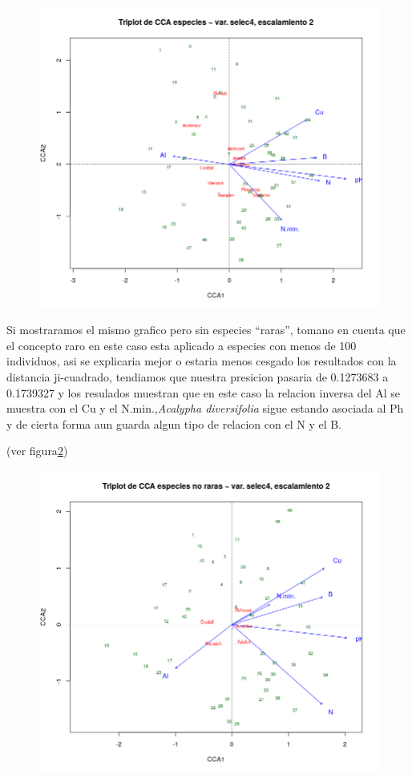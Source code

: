 \documentclass[11pt,]{article}
\begin{document}
\begin{figure}
\centering
\includegraphics{CCA.png}
\caption{\label{fig:CCA}}
\end{figure}

Si mostraramos el mismo grafico pero sin especies ``raras'', tomano en
cuenta que el concepto raro en este caso esta aplicado a especies con
menos de 100 individuos, asi se explicaria mejor o estaria menos cesgado
los resultados con la distancia ji-cuadrado, tendiamos que nuestra
presicion pasaria de 0.1273683 a 0.1739327 y los resulados muestran que
en este caso la relacion inversa del Al se muestra con el Cu y el
N.min.,\emph{Acalypha diversifolia} sigue estando asociada al Ph y de
cierta forma aun guarda algun tipo de relacion con el N y el B.

(ver figura\ref{fig:no_raras})

\begin{figure}
\centering
\includegraphics{no_raras.png}
\caption{\label{fig:no_raras}}
\end{figure}
\end{document}
